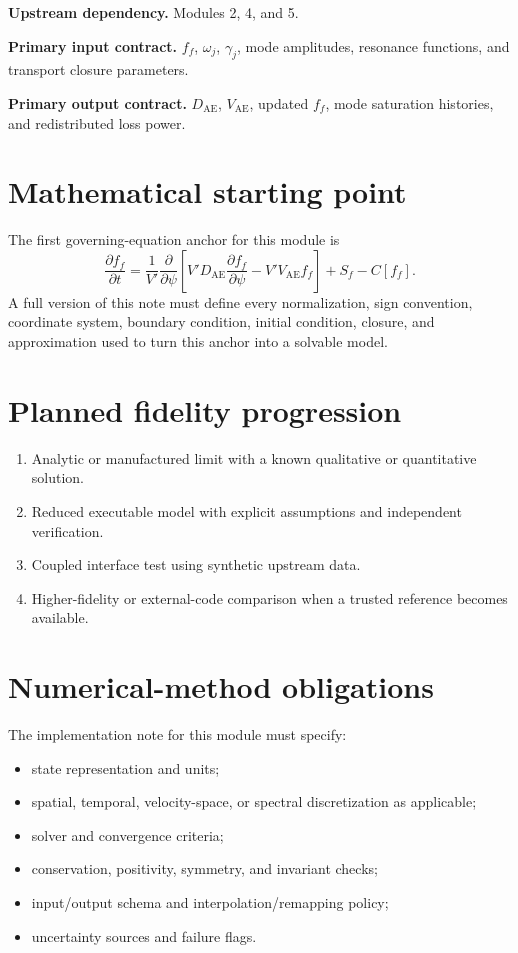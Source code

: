 \documentclass[11pt]{article}
\begin{document}
\textbf{Upstream dependency.} Modules 2, 4, and 5.

\textbf{Primary input contract.} $f_f$, $\omega_j$, $\gamma_j$, mode amplitudes, resonance functions, and transport closure parameters.

\textbf{Primary output contract.} $D_{\mathrm{AE}}$, $V_{\mathrm{AE}}$, updated $f_f$, mode saturation histories, and redistributed loss power.

\section{Mathematical starting point}
The first governing-equation anchor for this module is
\begin{equation}
\frac{\partial f_f}{\partial t}=\frac{1}{V\prime}\frac{\partial}{\partial\psi}\left[V\prime D_{\mathrm{AE}}\frac{\partial f_f}{\partial\psi}-V\prime V_{\mathrm{AE}}f_f\right]+S_f-C[f_f].
\end{equation}
A full version of this note must define every normalization, sign convention, coordinate system, boundary condition, initial condition, closure, and approximation used to turn this anchor into a solvable model.

\section{Planned fidelity progression}
\begin{enumerate}[leftmargin=1.6em]
\item Analytic or manufactured limit with a known qualitative or quantitative solution.
\item Reduced executable model with explicit assumptions and independent verification.
\item Coupled interface test using synthetic upstream data.
\item Higher-fidelity or external-code comparison when a trusted reference becomes available.
\end{enumerate}

\section{Numerical-method obligations}
The implementation note for this module must specify:
\begin{itemize}[leftmargin=1.6em]
\item state representation and units;
\item spatial, temporal, velocity-space, or spectral discretization as applicable;
\item solver and convergence criteria;
\item conservation, positivity, symmetry, and invariant checks;
\item input/output schema and interpolation/remapping policy;
\item uncertainty sources and failure flags.
\end{itemize}
\end{document}
